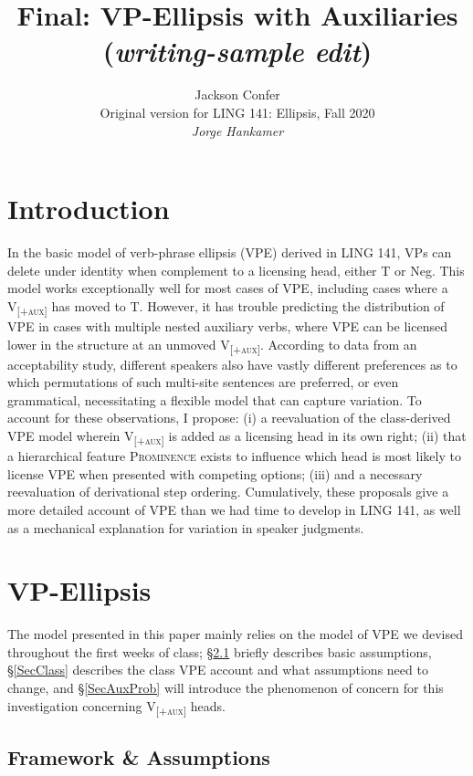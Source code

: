 \documentclass[11pt, oneside]{article}
\title{Final: VP-Ellipsis with Auxiliaries (\textit{writing-sample edit})}
\author{Jackson Confer\\Original version for LING 141: Ellipsis, Fall 2020\\\textit{Jorge Hankamer}}
\begin{document}
\maketitle


\section{Introduction}

In the basic model of verb-phrase ellipsis (VPE) derived in LING 141, VPs can delete under identity when complement to a licensing head, either T or Neg. This model works exceptionally well for most cases of VPE, including cases where a V\textsubscript{\textsc{[+aux]}} has moved to T. However, it has trouble predicting the distribution of VPE in cases with multiple nested auxiliary verbs, where VPE can be licensed lower in the structure at an unmoved V\textsubscript{\textsc{[+aux]}}.  According to data from an acceptability study, different speakers also have vastly different preferences as to which permutations of such multi-site sentences are preferred, or even grammatical, necessitating a flexible model that can capture variation. To account for these observations, I propose: (i) a reevaluation of the class-derived VPE model wherein V\textsubscript{\textsc{[+aux]}} is added as a licensing head in its own right; (ii) that a hierarchical feature \textsc{Prominence} exists to influence which head is most likely to license VPE when presented with competing options; (iii) and a necessary reevaluation of derivational step ordering. Cumulatively, these proposals give a more detailed account of VPE than we had time to develop in LING 141, as well as a mechanical explanation for variation in speaker judgments.

\section{VP-Ellipsis}

The model presented in this paper mainly relies on the model of VPE we devised throughout the first weeks of class; \S\ref{ass} briefly describes basic assumptions, \S\ref{SecClass} describes the class VPE account and what assumptions need to change, and \S\ref{SecAuxProb} will introduce the phenomenon of concern for this investigation concerning V\textsubscript{\textsc{[+aux]}} heads.

\subsection{Framework \& Assumptions}\label{ass}
\end{document}
